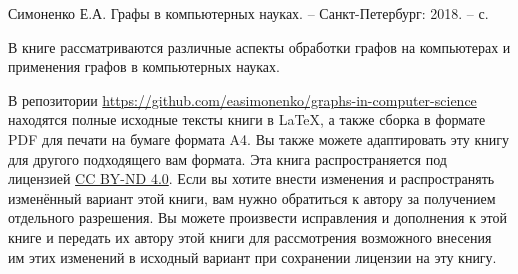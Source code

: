 
Симоненко Е.А. Графы в компьютерных науках. – Санкт-Петербург: 2018. 
– \pageref{LastPage} с.

В книге рассматриваются различные аспекты обработки графов на компьютерах и 
применения графов в компьютерных науках.

В репозитории \url{https://github.com/easimonenko/graphs-in-computer-science} 
находятся полные исходные тексты книги в \LaTeX, а также сборка в формате PDF 
для печати на бумаге формата A4. Вы также можете адаптировать эту книгу для 
другого подходящего вам формата. Эта книга распространяется под 
лицензией \href{https://creativecommons.org/licenses/by-nd/4.0/legalcode}{CC 
BY-ND 4.0}. Если вы хотите внести изменения и распространять изменённый вариант 
этой книги, вам нужно обратиться к автору за получением отдельного разрешения. 
Вы можете произвести исправления и дополнения к этой книге и передать их автору 
этой книги для рассмотрения возможного внесения им этих изменений в исходный 
вариант при сохранении лицензии на эту книгу.
